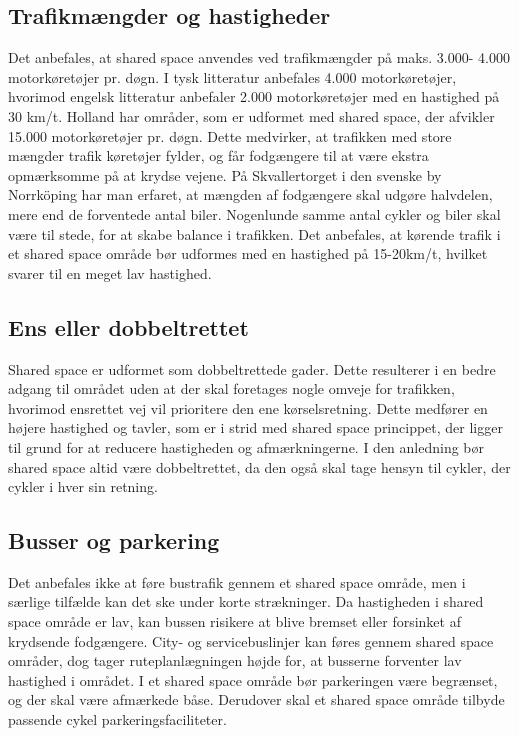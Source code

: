 \subsection{Trafikmængder og hastigheder}
\label{sub:Trafikmaengder_og_hastgheder}
Det anbefales, at shared space anvendes ved trafikmængder på maks. 3.000- 4.000 motorkøretøjer pr. døgn. I tysk litteratur anbefales 4.000 motorkøretøjer, hvorimod engelsk litteratur anbefaler 2.000 motorkøretøjer med en hastighed på 30 km/t. Holland har områder, som er udformet med shared space, der afvikler 15.000 motorkøretøjer pr. døgn. Dette medvirker, at trafikken med store mængder trafik køretøjer fylder, og får fodgængere til at være ekstra opmærksomme på at krydse vejene. På Skvallertorget i den svenske by Norrköping har man erfaret, at mængden af fodgængere skal udgøre halvdelen, mere end de forventede antal biler. Nogenlunde samme antal cykler og biler skal være til stede, for at skabe balance i trafikken. Det anbefales, at kørende trafik i et shared space område bør udformes med en hastighed på 15-20km/t, hvilket svarer til en meget lav hastighed. %
\subsection{Ens eller dobbeltrettet}
\label{sub:ens_eller_dobbeltrettet}
Shared space er udformet som dobbeltrettede gader. Dette resulterer i en bedre adgang til området uden at der skal foretages nogle omveje for trafikken, hvorimod ensrettet vej vil prioritere den ene kørselsretning. Dette medfører en højere hastighed og tavler, som er i strid med shared space princippet, der ligger til grund for at reducere hastigheden og afmærkningerne. I den anledning bør shared space altid være dobbeltrettet, da den også skal tage hensyn til cykler, der cykler i hver sin retning. %

\subsection{Busser og parkering}
\label{sub:Busser_og_parkering}
Det anbefales ikke at føre bustrafik gennem et shared space område, men i særlige tilfælde kan det ske under korte strækninger.  Da hastigheden i shared space område er lav, kan bussen risikere at blive bremset eller forsinket af krydsende fodgængere. City- og servicebuslinjer kan føres gennem shared space områder, dog tager ruteplanlægningen højde for, at busserne forventer lav hastighed i området.
I et shared space område bør parkeringen være begrænset, og der skal være afmærkede båse. Derudover skal et shared space område tilbyde passende cykel parkeringsfaciliteter. %

